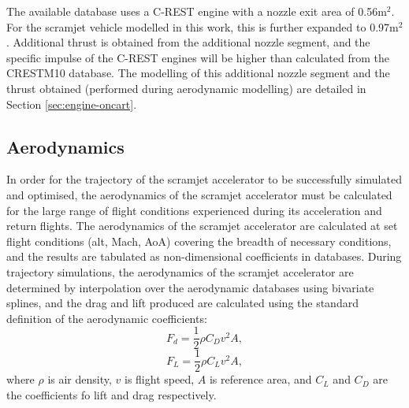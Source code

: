 The available database uses a C-REST engine with a nozzle exit area of 0.56m$^2$. For the scramjet vehicle modelled in this work, this is further expanded to 0.97m$^2$. Additional thrust is obtained from the additional nozzle segment, and the specific impulse of the C-REST engines will be higher than calculated from the \textsf{CRESTM10} database. The modelling of this additional nozzle segment and the thrust obtained (performed during aerodynamic modelling) are detailed in Section \ref{sec:engine-oncart}.






		
		
		\subsection{Aerodynamics}\label{sec:aero}
		
		
		
In order for the trajectory of the scramjet accelerator to be successfully simulated and optimised, the aerodynamics of the scramjet accelerator must be calculated for the large range of flight conditions experienced during its acceleration and return flights. 
The aerodynamics of the scramjet accelerator are calculated at set flight conditions (alt, Mach, AoA) covering the breadth of necessary conditions, and the results are tabulated as non-dimensional coefficients in databases. During trajectory simulations, the aerodynamics of the scramjet accelerator are determined by interpolation over the aerodynamic databases using bivariate splines, and the drag and lift produced are calculated using the standard definition of the aerodynamic coefficients:
\begin{equation}
F_d = \frac{1}{2}\rho C_D v^2 A ,
\end{equation}
\begin{equation}
F_L = \frac{1}{2}\rho C_L v^2 A ,
\end{equation}
where $\rho$ is air density, $v$ is flight speed, $A$ is reference area, and $C_L$ and $C_D$ are the coefficients fo lift and drag respectively.


